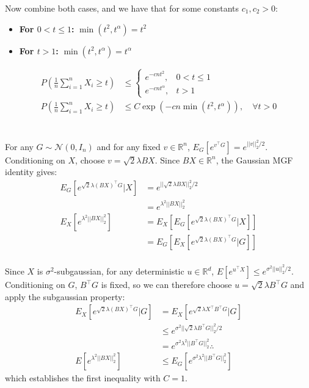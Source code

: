 \documentclass[11pt,a4paper,margin=1in]{article}
\begin{document}
\noindent
Now combine both cases, and we have that for some constants $c_1, c_2 > 0$:
\begin{itemize}
    \item \textbf{For $0 < t \leq 1$:} $\min(t^2, t^\alpha) = t^2$
    \item \textbf{For $t > 1$:} $\min(t^2, t^\alpha) = t^\alpha$
\end{itemize}
\begin{align*}
    P\left(\frac{1}{n} \sum_{i=1}^n X_i \geq t\right) &\leq \begin{cases}
        e^{-cnt^2}, & 0 < t \leq 1 \\
        e^{-cnt^\alpha}, & t > 1
    \end{cases} \\
    P\left(\frac{1}{n} \sum_{i=1}^n X_i \geq t\right) &\leq C\exp\left(-cn\min(t^2, t^\alpha)\right), \quad \forall t > 0
\end{align*}

\section{}
For any $G \sim \mathcal{N}(0, I_n)$ and for any fixed $v \in \mathbb{R}^n$,
$E_G[e^{v^\top G}] = e^{||v||_2^2/2}$. Conditioning on $X$, choose $v = \sqrt{2}\lambda B X$.
Since $BX \in \mathbb{R}^n$, the Gaussian MGF identity gives:
\begin{align*}
    E_G[e^{\sqrt{2}\lambda (BX)^\top G} | X] &= e^{||\sqrt{2}\lambda BX||_2^2/2} \\
    &= e^{\lambda^2 ||BX||_2^2} \\
    E_X[e^{\lambda^2 ||BX||_2^2}] &= E_X[E_G[e^{\sqrt{2}\lambda (BX)^\top G} | X]] \\
    &= E_G[E_X[e^{\sqrt{2}\lambda (BX)^\top G} | G]] \\
\end{align*}

\noindent
Since $X$ is $\sigma^2$-subgaussian, for any deterministic $u \in \mathbb{R}^d$,
$E[e^{u^\top X}] \leq e^{\sigma^2 ||u||_2^2/2}$. Conditioning on $G$, $B^\top G$
is fixed, so we can therefore choose $u = \sqrt{2}\lambda B^\top G$ and apply
the subgaussian property:
\begin{align*}
    E_X[e^{\sqrt{2}\lambda (BX)^\top G} | G] &= E_X[e^{\sqrt{2}\lambda X^\top B^\top G} | G] \\
    &\leq e^{\sigma^2 ||\sqrt{2}\lambda B^\top G||_2^2/2} \\
    &= e^{\sigma^2 \lambda^2 ||B^\top G||_2^2} \therefore \\
    E[e^{\lambda^2 ||BX||_2^2}] &\leq E_G[e^{\sigma^2 \lambda^2 ||B^\top G||_2^2}]
\end{align*}
which establishes the first inequality with $C = 1$. \\
\end{document}
